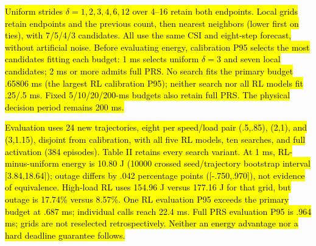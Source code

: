 \documentclass[letterpaper,conference]{IEEEtran}
\newcommand{\rev}[1]{\hl{#1}}
\newcommand{\rev}[1]{\hl{#1}}
\begin{document}
\rev{Uniform strides $\delta=1,2,3,4,6,12$ over 4--16 retain both endpoints. Local grids retain endpoints and the previous count, then nearest neighbors (lower first on ties), with 7/5/4/3 candidates. All use the same CSI and eight-step forecast, without artificial noise. Before evaluating energy, calibration P95 selects the most candidates fitting each budget: 1 ms selects uniform $\delta=3$ and seven local candidates; 2 ms or more admits full PRS. No search fits the primary budget .65806 ms (the largest RL calibration P95); neither search nor all RL models fit .25/.5 ms. Fixed 5/10/20/200-ms budgets also retain full PRS. The physical decision period remains 200 ms.}

\rev{Evaluation uses 24 new trajectories, eight per speed/load pair (.5,.85), (2,1), and (3,1.15), disjoint from calibration, with all five RL models, ten searches, and full activation (384 episodes). Table II retains every search variant. At 1 ms, RL-minus-uniform energy is 10.80 J (10000 crossed seed/trajectory bootstrap interval [3.84,18.64]); outage differs by .042 percentage points ([-.750,.970]), not evidence of equivalence. High-load RL uses 154.96 J versus 177.16 J for that grid, but outage is 17.74\% versus 8.57\%. One RL evaluation P95 exceeds the primary budget at .687 ms; individual calls reach 22.4 ms. Full PRS evaluation P95 is .964 ms; grids are not reselected retrospectively. Neither an energy advantage nor a hard deadline guarantee follows.}
\end{document}
